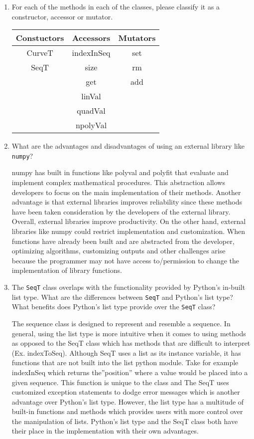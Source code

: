 \documentclass[12pt]{article}
\begin{document}
\begin{enumerate}

\item For each of the methods in each of the classes, please classify it as a
  constructor, accessor or mutator.
\begin{center}
\begin{tabular}{ | c | c | c |}
\hline
Constuctors & Accessors & Mutators \\
\hline
CurveT & indexInSeq & set \\
\hline
SeqT & size & rm \\
\hline
& get & add \\
\hline
& linVal &  \\
\hline
& quadVal &  \\
\hline
& npolyVal &  \\
\hline
\end{tabular}
\end{center}

\item What are the advantages and disadvantages of using an external library
  like \texttt{numpy}?

numpy has built in functions like polyval and polyfit that evaluate and implement complex mathematical procedures. This abstraction allows developers to focus on the main implementation of their methods. Another advantage is that external libraries improves reliability since these methods have been taken consideration by the developers of the external library. Overall, external libraries improve productivity. On the other hand, external libraries like numpy could restrict implementation and customization. When functions have already been built and are abstracted from the developer, optimizing algorithms, customizing outputs and other challenges arise because the programmer may not have access to/permission to change the implementation of library functions.

\item The \texttt{SeqT} class overlaps with the functionality provided by
  Python's in-built list type.  What are the differences between \texttt{SeqT}
  and Python's list type?  What benefits does Python's list type provide over
  the \texttt{SeqT} class?

The sequence class is designed to represent and resemble a sequence. In general, using the list type is more intuitive when it comes to using methods as opposed to the SeqT class which has methods that are difficult to interpret (Ex. indexToSeq). Although SeqT uses a list as its instance variable, it has functions that are not built into the list python module. Take for example indexInSeq which returns the”position” where a value would be placed into a given sequence. This function is unique to the class and The SeqT uses customized exception statements to dodge error messages which is another advantage over Python’s list type. However, the list type has a multitude of built-in functions and methods which provides users with more control over the manipulation of lists. Python’s list type and the SeqT class both have their place in the implementation with their own advantages.


\end{enumerate}
\end{document}
